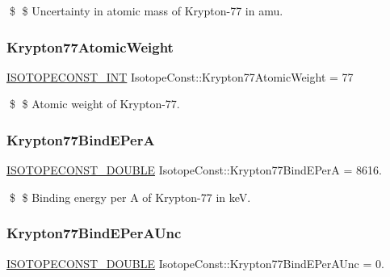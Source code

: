 \$ \$ Uncertainty in atomic mass of Krypton-\/77 in amu. \mbox{\label{group___isotope_const-_krypton-_kr77_ga13096e01ed5de786853b1f709df3856d}} 
\subsubsection{\texorpdfstring{Krypton77\+Atomic\+Weight}{Krypton77AtomicWeight}}
{\footnotesize\ttfamily \mbox{\hyperlink{group___isotope_const-_macros_ga5f18360b3e99483a35c32d789e62621c}{I\+S\+O\+T\+O\+P\+E\+C\+O\+N\+S\+T\+\_\+\+I\+NT}} Isotope\+Const\+::\+Krypton77\+Atomic\+Weight = 77}

\$ \$ Atomic weight of Krypton-\/77. \mbox{\label{group___isotope_const-_krypton-_kr77_ga0fc8250c96b0a04906ddae84d3dc6d76}} 
\subsubsection{\texorpdfstring{Krypton77\+Bind\+E\+PerA}{Krypton77BindEPerA}}
{\footnotesize\ttfamily \mbox{\hyperlink{group___isotope_const-_macros_ga8f45a7272ce02c0b4c65c44636ed719a}{I\+S\+O\+T\+O\+P\+E\+C\+O\+N\+S\+T\+\_\+\+D\+O\+U\+B\+LE}} Isotope\+Const\+::\+Krypton77\+Bind\+E\+PerA = 8616.}

\$ \$ Binding energy per A of Krypton-\/77 in keV. \mbox{\label{group___isotope_const-_krypton-_kr77_ga7965e7bdaa90a0b9a603dcc7524de7ac}} 
\subsubsection{\texorpdfstring{Krypton77\+Bind\+E\+Per\+A\+Unc}{Krypton77BindEPerAUnc}}
{\footnotesize\ttfamily \mbox{\hyperlink{group___isotope_const-_macros_ga8f45a7272ce02c0b4c65c44636ed719a}{I\+S\+O\+T\+O\+P\+E\+C\+O\+N\+S\+T\+\_\+\+D\+O\+U\+B\+LE}} Isotope\+Const\+::\+Krypton77\+Bind\+E\+Per\+A\+Unc = 0.}

